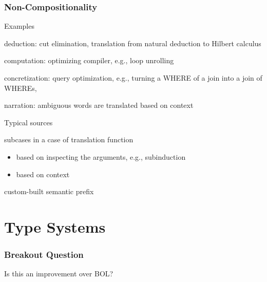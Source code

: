 \begin{frame}\frametitle{Non-Compositionality}
\begin{blockitems}{Examples}
 \item deduction: cut elimination, translation from natural deduction to Hilbert calculus
 \item computation: optimizing compiler, e.g., loop unrolling
 \item concretization: query optimization, e.g., turning a WHERE of a join into a join of WHEREs,
 \item narration: ambiguous words are translated based on context
\end{blockitems}

\begin{blockitems}{Typical sources}
 \item subcases in a case of translation function
  \begin{itemize}
  \item based on inspecting the arguments, e.g., subinduction
  \item based on context
  \end{itemize}
 \item custom-built semantic prefix
\end{blockitems}
\end{frame}

\section{Type Systems}

\begin{frame}\frametitle{Breakout Question}
Is this an improvement over BOL?
\begin{commgrammar}
\\
\\
\\
\\
\\
\end{commgrammar}
\end{frame}

